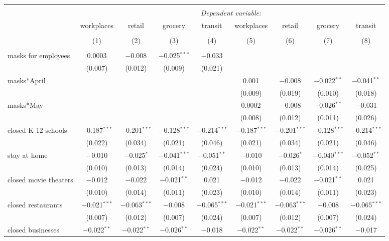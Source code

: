 \begin{tabular}{@{\extracolsep{1pt}}lcccccccc} 
\\[-1.8ex]\hline 
\hline \\[-1.8ex] 
 & \multicolumn{8}{c}{\textit{Dependent variable:}} \\ 
\cline{2-9} 
 & workplaces & retail & grocery & transit & workplaces & retail & grocery & transit \\ 
\\[-1.8ex] & (1) & (2) & (3) & (4) & (5) & (6) & (7) & (8)\\ 
\hline \\[-1.8ex] 
 masks for employees & 0.0003 & $-$0.008 & $-$0.025$^{***}$ & $-$0.033 &  &  &  &  \\ 
  & (0.007) & (0.012) & (0.009) & (0.021) &  &  &  &  \\ 
  masks*April &  &  &  &  & 0.001 & $-$0.008 & $-$0.022$^{**}$ & $-$0.041$^{**}$ \\ 
  &  &  &  &  & (0.009) & (0.019) & (0.010) & (0.018) \\ 
  masks*May &  &  &  &  & 0.0002 & $-$0.008 & $-$0.026$^{**}$ & $-$0.031 \\ 
  &  &  &  &  & (0.008) & (0.012) & (0.011) & (0.026) \\ 
  closed K-12 schools & $-$0.187$^{***}$ & $-$0.201$^{***}$ & $-$0.128$^{***}$ & $-$0.214$^{***}$ & $-$0.187$^{***}$ & $-$0.201$^{***}$ & $-$0.128$^{***}$ & $-$0.214$^{***}$ \\ 
  & (0.022) & (0.034) & (0.021) & (0.046) & (0.021) & (0.034) & (0.021) & (0.046) \\ 
  stay at home & $-$0.010 & $-$0.025$^{*}$ & $-$0.041$^{***}$ & $-$0.051$^{**}$ & $-$0.010 & $-$0.026$^{*}$ & $-$0.040$^{***}$ & $-$0.052$^{**}$ \\ 
  & (0.010) & (0.013) & (0.014) & (0.024) & (0.010) & (0.013) & (0.014) & (0.025) \\ 
  closed movie theaters & $-$0.012 & $-$0.022 & $-$0.021$^{**}$ & 0.021 & $-$0.012 & $-$0.022 & $-$0.021$^{**}$ & 0.021 \\ 
  & (0.010) & (0.014) & (0.011) & (0.023) & (0.010) & (0.014) & (0.011) & (0.023) \\ 
  closed restaurants & $-$0.021$^{***}$ & $-$0.063$^{***}$ & $-$0.008 & $-$0.065$^{***}$ & $-$0.021$^{***}$ & $-$0.063$^{***}$ & $-$0.008 & $-$0.065$^{***}$ \\ 
  & (0.007) & (0.012) & (0.007) & (0.024) & (0.007) & (0.012) & (0.007) & (0.024) \\ 
  closed businesses & $-$0.022$^{**}$ & $-$0.022$^{**}$ & $-$0.026$^{**}$ & $-$0.018 & $-$0.022$^{**}$ & $-$0.022$^{**}$ & $-$0.026$^{**}$ & $-$0.017 \\ 

\end{tabular}
